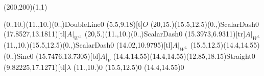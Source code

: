 \unitlength=1bp%

\begin{feynartspicture}(200,200)(1,1)

\FADiagram{}
\FAProp(0.,10.)(11.,10.)(0.,){DoubleLine}{0}
\FALabel(5.5,9.18)[t]{$O$}
\FAProp(20,15.)(15.5,12.5)(0.,){ScalarDash}{0}
\FALabel(17.8527,13.1811)[tl]{$A|_{W^\perp}$}
\FAProp(20,5.)(11.,10.)(0.,){ScalarDash}{0}
\FALabel(15.3973,6.9311)[tr]{$A|_{W^\perp}$}
\FAProp(11.,10.)(15.5,12.5)(0.,){ScalarDash}{0}
\FALabel(14.02,10.9795)[tl]{$A|_{W^\perp}$}
\FAProp(15.5,12.5)(14.4,14.55)(0.,){Sine}{0}
\FALabel(15.7476,13.7305)[bl]{$A|_V$}
\FAProp(14.4,14.55)(14.4,14.55)(12.85,18.15){Straight}{0}
\FALabel(9.82225,17.1271)[tl]{$\lambda$}
\FAVert(11.,10.){0}
\FAVert(15.5,12.5){0}
\FAVert(14.4,14.55){0}
\end{feynartspicture}

